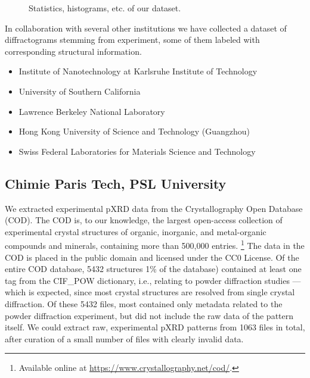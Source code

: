 



\begin{figure*}[!ht]
    \centering
    \missingfigure{} 
    \caption{Statistics, histograms, etc. of our dataset.}
    \label{fig:statistics}
\end{figure*}

In collaboration with several other institutions we have collected a dataset of diffractograms stemming from experiment, some of them labeled with corresponding structural information. 

\begin{itemize}
    \item Institute of Nanotechnology at Karlsruhe Institute of Technology
    \item University of Southern California
    \item Lawrence Berkeley National Laboratory
    \item Hong Kong University of Science and Technology (Guangzhou)
    \item Swiss Federal Laboratories for Materials Science and Technology
\end{itemize}

\subsection*{Chimie Paris Tech, PSL University}

We extracted experimental pXRD data from the Crystallography Open Database (COD).\cite{Grazulis2009, Vaitkus2023} The COD is, to our knowledge, the largest open-access collection of experimental crystal structures of organic, inorganic, and metal-organic compounds and minerals, containing more than 500,000 entries. \footnote{Available online at \url{https://www.crystallography.net/cod/}.} The data in the COD is placed in the public domain and licensed under the CC0 License. Of the entire COD database, 5432 structures 1\% of the database) contained at least one tag from the {CIF\_POW} dictionary, i.e., relating to powder diffraction studies --- which is expected, since most crystal structures are resolved from single crystal diffraction. Of these 5432 files, most contained only metadata related to the powder diffraction experiment, but did not include the raw data of the pattern itself. We could extract raw, experimental pXRD patterns from 1063 files in total, after curation of a small number of files with clearly invalid data. \\

